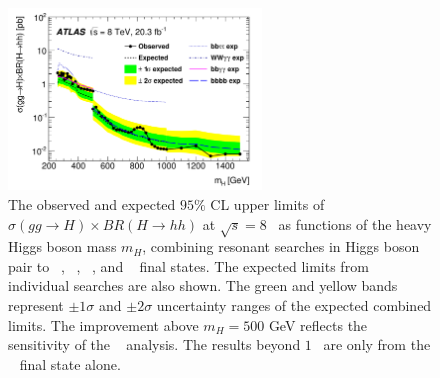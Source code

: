 \begin{figure}[htbp!]
  \centering
  \includegraphics[width=0.6\textwidth]{figures/theory/Run1_ATLAS}
  \caption{The observed and expected $95\%$ CL upper limits of $\sigma(gg \to H) \times BR(H \to hh)$ at $\sqrt{s}=8$\TeV~ as functions of the heavy Higgs boson mass $m_{H}$, combining resonant searches in Higgs boson pair to \bbtautau~, \WWgg~, \bbgg~, and \bbbb~ final states. The expected limits from individual searches are also shown. The green and yellow bands represent $\pm 1\sigma$ and $\pm 2\sigma$ uncertainty ranges of the expected combined limits. The improvement above $m_{H} =500$ GeV reflects the sensitivity of the \bbbb~ analysis. The results beyond $1$\TeV~ are only from the \bbbb~ final state alone.}
  \label{fig:Run1_ATLAS}
\end{figure}

